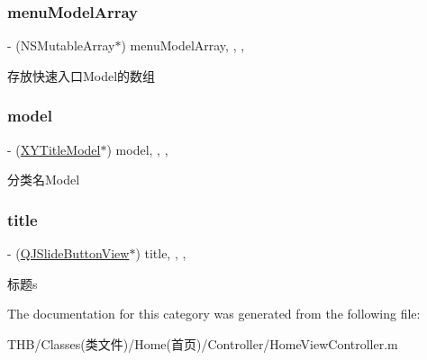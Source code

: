 \subsubsection{\texorpdfstring{menu\+Model\+Array}{menuModelArray}}
{\footnotesize\ttfamily -\/ (N\+S\+Mutable\+Array$\ast$) menu\+Model\+Array\hspace{0.3cm}{\ttfamily [read]}, {\ttfamily [write]}, {\ttfamily [nonatomic]}, {\ttfamily [strong]}}

存放快速入口\+Model的数组 \mbox{\label{category_home_view_controller_07_08_ad9334810ee9ac6d178f02e8a7511574f}} 
\subsubsection{\texorpdfstring{model}{model}}
{\footnotesize\ttfamily -\/ (\mbox{\hyperlink{interface_x_y_title_model}{X\+Y\+Title\+Model}}$\ast$) model\hspace{0.3cm}{\ttfamily [read]}, {\ttfamily [write]}, {\ttfamily [nonatomic]}, {\ttfamily [retain]}}

分类名\+Model \mbox{\label{category_home_view_controller_07_08_ab562f83f0d8eaf5d671f9fb4380bdbd9}} 
\subsubsection{\texorpdfstring{title}{title}}
{\footnotesize\ttfamily -\/ (\mbox{\hyperlink{interface_q_j_slide_button_view}{Q\+J\+Slide\+Button\+View}}$\ast$) title\hspace{0.3cm}{\ttfamily [read]}, {\ttfamily [write]}, {\ttfamily [nonatomic]}, {\ttfamily [strong]}}

标题s 

The documentation for this category was generated from the following file\+:\begin{DoxyCompactItemize}
\item 
T\+H\+B/\+Classes(类文件)/\+Home(首页)/\+Controller/Home\+View\+Controller.\+m\end{DoxyCompactItemize}
